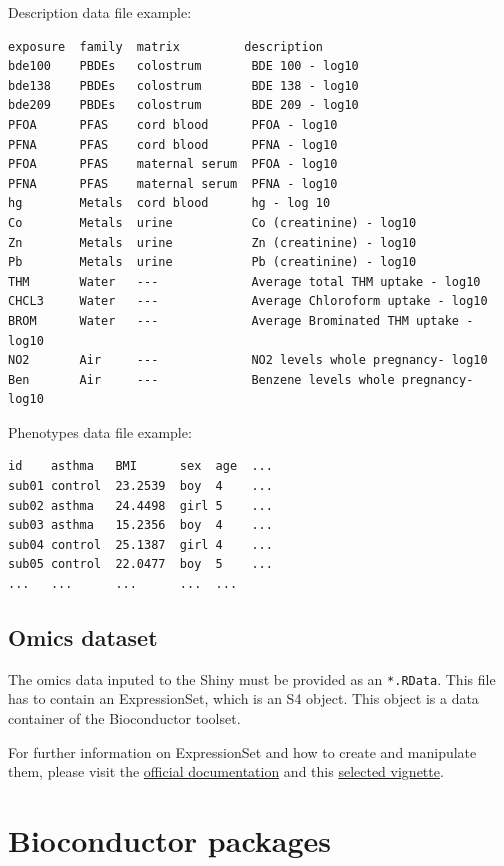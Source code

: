 \documentclass[
]{book}
\begin{document}
Description data file example:

\begin{verbatim}
exposure  family  matrix         description
bde100    PBDEs   colostrum       BDE 100 - log10
bde138    PBDEs   colostrum       BDE 138 - log10
bde209    PBDEs   colostrum       BDE 209 - log10
PFOA      PFAS    cord blood      PFOA - log10
PFNA      PFAS    cord blood      PFNA - log10
PFOA      PFAS    maternal serum  PFOA - log10
PFNA      PFAS    maternal serum  PFNA - log10
hg        Metals  cord blood      hg - log 10
Co        Metals  urine           Co (creatinine) - log10
Zn        Metals  urine           Zn (creatinine) - log10
Pb        Metals  urine           Pb (creatinine) - log10
THM       Water   ---             Average total THM uptake - log10
CHCL3     Water   ---             Average Chloroform uptake - log10
BROM      Water   ---             Average Brominated THM uptake - log10
NO2       Air     ---             NO2 levels whole pregnancy- log10
Ben       Air     ---             Benzene levels whole pregnancy- log10
\end{verbatim}

Phenotypes data file example:

\begin{verbatim}
id    asthma   BMI      sex  age  ...
sub01 control  23.2539  boy  4    ...
sub02 asthma   24.4498  girl 5    ...
sub03 asthma   15.2356  boy  4    ...
sub04 control  25.1387  girl 4    ...
sub05 control  22.0477  boy  5    ...
...   ...      ...      ...  ...
\end{verbatim}

\hypertarget{omics-dataset}{%
\section{Omics dataset}\label{omics-dataset}}

The omics data inputed to the Shiny must be provided as an \texttt{*.RData}. This file has to contain an ExpressionSet, which is an S4 object. This object is a data container of the Bioconductor toolset.

For further information on ExpressionSet and how to create and manipulate them, please visit the \href{https://www.bioconductor.org/packages/devel/bioc/vignettes/Biobase/inst/doc/ExpressionSetIntroduction.pdf}{official documentation} and this \href{https://kasperdanielhansen.github.io/genbioconductor/html/ExpressionSet.html}{selected vignette}.

\hypertarget{bioconductor-packages}{%
\chapter{Bioconductor packages}\label{bioconductor-packages}}
\end{document}
